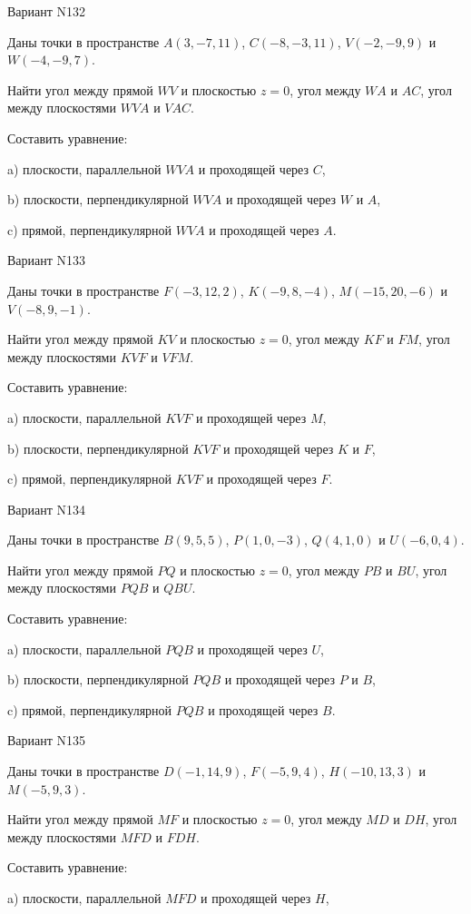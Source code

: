 \documentclass[11pt]{report}
\begin{document}
Вариант N132

Даны точки в пространстве
$A(3, -7, 11)$, $C(-8, -3, 11)$, $V(-2, -9, 9)$ и
$W(-4, -9, 7)$.

Найти угол между прямой $WV$ и плоскостью $z = 0$, угол между $WA$ и $AC$, угол между плоскостями $WVA$ 
и $VAC$.

Составить уравнение: 

a) плоскости, параллельной $WVA$ и проходящей через $C$,

b) плоскости, перпендикулярной $WVA$ и проходящей через $W$ и $A$,

c) прямой, перпендикулярной $WVA$ и проходящей через $A$.

Вариант N133

Даны точки в пространстве
$F(-3, 12, 2)$, $K(-9, 8, -4)$, $M(-15, 20, -6)$ и
$V(-8, 9, -1)$.

Найти угол между прямой $KV$ и плоскостью $z = 0$, угол между $KF$ и $FM$, угол между плоскостями $KVF$ 
и $VFM$.

Составить уравнение: 

a) плоскости, параллельной $KVF$ и проходящей через $M$,

b) плоскости, перпендикулярной $KVF$ и проходящей через $K$ и $F$,

c) прямой, перпендикулярной $KVF$ и проходящей через $F$.

Вариант N134

Даны точки в пространстве
$B(9, 5, 5)$, $P(1, 0, -3)$, $Q(4, 1, 0)$ и
$U(-6, 0, 4)$.

Найти угол между прямой $PQ$ и плоскостью $z = 0$, угол между $PB$ и $BU$, угол между плоскостями $PQB$ 
и $QBU$.

Составить уравнение: 

a) плоскости, параллельной $PQB$ и проходящей через $U$,

b) плоскости, перпендикулярной $PQB$ и проходящей через $P$ и $B$,

c) прямой, перпендикулярной $PQB$ и проходящей через $B$.

Вариант N135

Даны точки в пространстве
$D(-1, 14, 9)$, $F(-5, 9, 4)$, $H(-10, 13, 3)$ и
$M(-5, 9, 3)$.

Найти угол между прямой $MF$ и плоскостью $z = 0$, угол между $MD$ и $DH$, угол между плоскостями $MFD$ 
и $FDH$.

Составить уравнение: 

a) плоскости, параллельной $MFD$ и проходящей через $H$,
\end{document}
